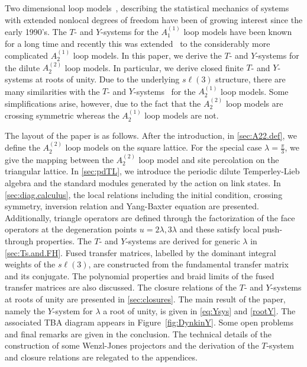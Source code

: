 \documentclass[11pt]{article}
\numberwithin{equation}{section}
\theoremstyle{plain}
\numberwithin{equation}{section}
\begin{document}
Two dimensional loop models~\cite{Nienhuis90,NW93}, describing the statistical mechanics of systems with extended nonlocal degrees of freedom have been of growing interest since the early 1990's. The $T$- and $Y$-systems for the $A_1^{(1)}$ loop models have been known for a long time   and recently this was extended~\cite{MDPR2018} to the considerably more complicated $A_2^{(1)}$ loop models. 
In this paper, we derive the $T$- and $Y$-systems for the dilute $A_2^{(2)}$ loop models.  In particular, we derive closed finite $T$- and $Y$-systems at roots of unity. Due to the underlying $s\ell(3)$ structure, there are many similarities with the $T$- and $Y$-systems~\cite{MDPR2018} for the $A_2^{(1)}$ loop models. Some simplifications arise, however, due to the fact that the $A_2^{(2)}$ loop models are crossing symmetric whereas the $A_2^{(1)}$ loop models are not. 

The layout of the paper is as follows. After the introduction, in \cref{sec:A22.def}, we define the $A_2^{(2)}$ loop models on the square lattice. For the special case $\lambda=\frac{\pi}{3}$, we give the mapping between the $A_2^{(2)}$ loop model and site percolation on the triangular lattice. In \cref{sec:pdTL}, we introduce the periodic dilute Temperley-Lieb algebra and the standard modules generated by the action on link states. In \cref{sec:diag.calculus}, the local relations including the initial condition, crossing symmetry, inversion relation and Yang-Baxter equation are presented. Additionally, triangle operators are defined through the factorization of the face operators at the degeneration points $u= 2\lambda, 3\lambda$ and these satisfy local push-through properties. The $T$- and $Y$-systems are derived for generic $\lambda$ in \cref{sec:Ts.and.FH}. Fused transfer matrices, labelled by the dominant integral weights of the $s\ell(3)$, are constructed from the fundamental transfer matrix and its conjugate. The polynomial properties and braid limits of the fused transfer matrices are also discussed. The closure relations of the $T$- and $Y$-systems at roots of unity are presented in \cref{sec:closures}. The main result of the paper, namely the $Y$-system for $\lambda$ a root of unity, is given in \eqref{eq:Ysys} and \eqref{rootY}. The associated TBA diagram appears in Figure~\ref{fig:DynkinY}. Some open problems and final remarks are given in the conclusion. The technical details of the construction of some Wenzl-Jones projectors and the derivation of the $T$-system and closure relations are relegated to the appendices.
\end{document}
